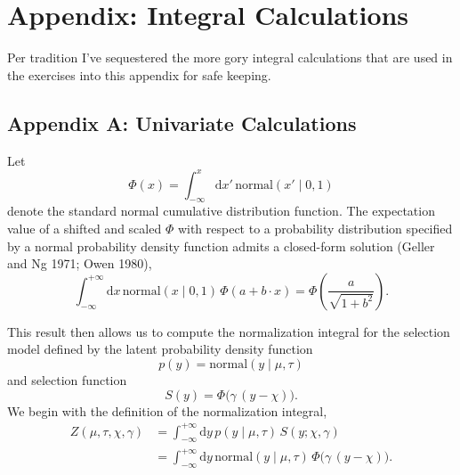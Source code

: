 \documentclass[
  letterpaper,
  DIV=11,
  numbers=noendperiod]{scrartcl}
\begin{document}
\section*{Appendix: Integral
Calculations}\label{appendix-integral-calculations}

Per tradition I've sequestered the more gory integral calculations that
are used in the exercises into this appendix for safe keeping.

\subsection*{Appendix A: Univariate
Calculations}\label{sec:appendix_uni}

Let \[
\Phi(x)
=
\int_{-\infty}^{x} \mathrm{d} x' \,
\text{normal}(x' \mid 0, 1)
\] denote the standard normal cumulative distribution function. The
expectation value of a shifted and scaled \(\Phi\) with respect to a
probability distribution specified by a normal probability density
function admits a closed-form solution (Geller and Ng 1971; Owen 1980),
\[
\int_{-\infty}^{+\infty} \mathrm{d} x \,
\text{normal}(x \mid 0, 1) \, \Phi(a + b \cdot x)
=
\Phi \left( \frac{ a }{ \sqrt{1 + b^{2} } } \right).
\]

This result then allows us to compute the normalization integral for the
selection model defined by the latent probability density function \[
p(y) = \text{normal}(y \mid \mu, \tau)
\] and selection function \[
S(y) = \Phi \big( \gamma \, (y - \chi) \big).
\] We begin with the definition of the normalization integral,
\begin{align*}
Z(\mu, \tau, \chi, \gamma)
&=
\int_{-\infty}^{+\infty} \mathrm{d} y \,
p(y \mid \mu, \tau) \, S(y; \chi, \gamma)
\\
&=
\int_{-\infty}^{+\infty} \mathrm{d} y \,
\text{normal}(y \mid \mu, \tau) \, \Phi \big( \gamma \, (y - \chi) \big).
\end{align*}
\end{document}
